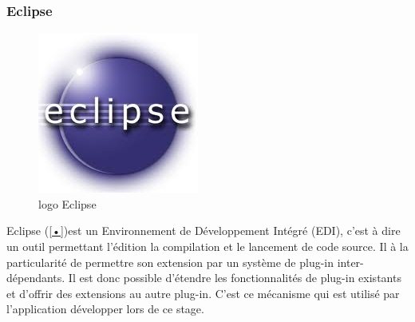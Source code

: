 \documentclass{article}
\begin{document}
	\subsubsection{Eclipse}
		\begin{figure}[h]
		  \centering
		  \includegraphics[scale=0.4]{img/logo_eclipse.jpeg}
		  \caption{logo Eclipse}
		\end{figure}
		Eclipse (\ref{•})est un Environnement de Développement Intégré (EDI), c'est à dire un outil permettant l'édition la compilation et le lancement de code source. Il à la particularité de permettre son extension par un système de plug-in inter-dépendants. Il est donc possible d'étendre les fonctionnalités de plug-in existants et d'offrir des extensions au autre plug-in. C'est ce mécanisme qui est utilisé par l'application développer lors de ce stage.
\end{document}
